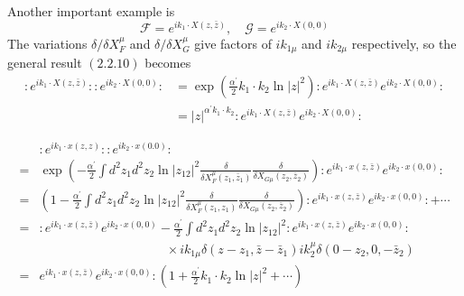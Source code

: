 Another important example is
\begin{equation}
\mathscr{F}=e^{i k_{1} \cdot X(z, \bar{z})}, \quad \mathscr{G}=e^{i k_{2} \cdot X(0,0)}
\end{equation}
The variations $\delta / \delta X_{F}^{\mu}$ and $\delta / \delta X_{G}^{\mu}$ give factors of $i k_{1 \mu}$ and $i k_{2 \mu}$ respectively, so the general result $(2.2 .10)$ becomes
\begin{equation}\label{2.2.13}
\begin{aligned}
: e^{i k_{1} \cdot X(z, \bar{z})}:: e^{i k_{2} \cdot X(0,0)}: &=\exp \left(\frac{\alpha^{\prime}}{2} k_{1} \cdot k_{2} \ln |z|^{2}\right): e^{i k_{1} \cdot X(z, \bar{z})} e^{i k_{2} \cdot X(0,0)} :\\
&=|z|^{\alpha^{\prime} k_{1} \cdot k_{2}}: e^{i k_{1} \cdot X(z, \bar{z})} e^{i k_{2} \cdot X(0,0)}:
\end{aligned}
\end{equation}

\begin{remark}
$$
\begin{aligned}
&:e^{i k_{1} \cdot x(z, z)}:: e^{i k_{2} \cdot x(0.0)}:\\
=&\exp \left(-\frac{\alpha^{\prime}}{2} \int d^{2} z_{1} d^{2} z_{2} \ln \left|z_{12}\right|^{2} \frac{\delta}{\delta X_{F}^{\mu}\left(z_{1}, \bar{z}_{1}\right)} \frac{\delta}{\delta X_{G\mu}\left(z_{2}, \bar{z}_{2}\right)}\right): e^{i k_{1} \cdot x(z, \bar{z})} e^{i k_{2} \cdot x(0,0)}:\\
=&\left(1-\frac{\alpha^{\prime}}{2} \int d^{2} z_{1} d^{2} z_{2} \ln \left|z_{12}\right|^{2} \frac{\delta}{\delta X_{F}^{\mu}\left(z_{1}, z_{1}\right)} \frac{\delta}{\delta X_{G \mu}\left(z_{2}, \bar{z}_{2}\right)} \right): e^{i k_{1} \cdot x(z, \bar{z})} e^{i k_{2} \cdot x(0,0)}:+\cdots\\
=&: e^{i k_{1} \cdot x(z, \bar{z})} e^{i k_{2} \cdot x(0,0)}-\frac{\alpha^{\prime}}{2} \int d^{2} z_{1} d^{2} z_{2} \ln \left|z_{12}\right|^{2}
:e^{i k_{1} \cdot x\left(z, \bar{z}\right)} e^{i k_{2} \cdot x ( 0,0)}:\\
&\qquad \qquad \qquad \qquad \qquad
 \times i k_{1 \mu} \delta\left(z-z_{1}, \bar{z}-\bar{z}_{1}\right) i k_{2}^{\mu} \delta\left(0-z_{2}, 0,-\bar{z}_{2}\right)\\
=&e^{i k_{1} \cdot x(z, \bar{z})} e^{i k_{2} \cdot x(0,0)}:\left(1+\frac{\alpha^{\prime}}{2} k_{1} \cdot k_{2} \ln |z|^{2}+\cdots\right)
\end{aligned}
$$
\end{remark}

